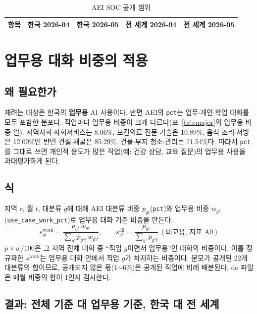 \documentclass[11pt]{article}
\begin{document}
\begin{longtable}{L{7.2cm}R{1.8cm}R{1.8cm}R{1.8cm}R{1.8cm}}
\caption{AEI SOC 공개 범위}\label{tab:cov}\\
\toprule
항목 & 한국 2026-04 & 한국 2026-05 & 전 세계 2026-04 & 전 세계 2026-05 \\
\midrule

\bottomrule
\end{longtable}

\section{업무용 대화 비중의 적용}

\subsection{왜 필요한가}

재려는 대상은 한국의 \textbf{업무용} AI 사용이다. 반면 AEI의 \texttt{pct}는 업무$\cdot$개인$\cdot$학업 대화를 모두 포함한 분포다. 직업마다 업무용 비중이 크게 다르다(표~\ref{tab:major}의 업무용 비중 열). 지역사회$\cdot$사회서비스는 8.06\%, 보건의료 전문$\cdot$기술은 10.89\%, 음식 조리$\cdot$서빙은 12.00\%인 반면 건설$\cdot$채굴은 85.29\%, 건물$\cdot$부지 청소$\cdot$관리는 71.54\%다. 따라서 \texttt{pct}를 그대로 쓰면 개인적 용도가 많은 직업(예: 건강 상담, 교육 질문)의 업무용 사용을 과대평가하게 된다.

\subsection{식}

지역 $r$, 월 $t$, 대분류 $g$에 대해 AEI 대분류 비중 $p_{gt}$(\texttt{pct})와 업무용 비중 $w_{gt}$(\texttt{use\_case\_work\_pct})로 업무용 대화 기준 비중을 만든다.
\[
s^{\text{work}}_{gt} = \frac{p_{gt}\, w_{gt}}{\sum_{g'} p_{g't}\, w_{g't}},\qquad
s^{\text{all}}_{gt} = \frac{p_{gt}}{\sum_{g'} p_{g't}}\ (\text{비교용, 지표 A0})
\]
$p \times w / 100$은 그 지역 전체 대화 중 ``직업 $g$이면서 업무용''인 대화의 비중이다. 이를 정규화한 $s^{\text{work}}$는 업무용 대화 안에서 직업 $g$가 차지하는 비중이다. 분모가 공개된 22개 대분류의 합이므로, 공개되지 않은 몫(1$\sim$6\%)은 공개된 직업에 비례 배분된다. do 파일은 매월 비중의 합이 1인지 검사한다.

\subsection{결과: 전체 기준 대 업무용 기준, 한국 대 전 세계}
\end{document}
